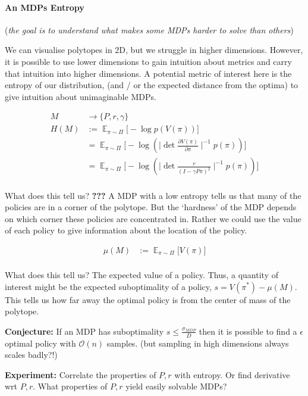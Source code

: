 \paragraph{An MDPs Entropy}

(\emph{the goal is to understand what makes some MDPs harder to solve
than others})

We can visualise polytopes in 2D, but we struggle in higher dimensions.
However, it is possible to use lower dimensions to gain intuition about
metrics and carry that intuition into higher dimensions. A potential
metric of interest here is the entropy of our distribution, (and / or
the expected distance from the optima) to give intuition about
unimaginable MDPs.

\begin{align}
M &\to \{P, r, \gamma\} \tag{a MDP}\\
H(M) &:= \mathop{\mathbb E}_{\pi\sim\Pi}\Big[-\log p(V(\pi)) \Big]\\
&= \mathop{\mathbb E}_{\pi\sim\Pi}\Big[-\log(\mid \det\frac{\partial V(\pi)}{\partial \pi}\mid^{-1}p(\pi)) \Big] \\
&= \mathop{\mathbb E}_{\pi\sim\Pi}\Big[-\log(\mid \det \frac{r}{(I-\gamma P \pi)^2}\mid^{-1}p(\pi)) \Big] \\
\end{align}

What does this tell us? \textbf{???} A MDP with a low entropy tells us
that many of the policies are in a corner of the polytope. But the
`hardness' of the MDP depends on which corner these policies are
concentrated in. Rather we could use the value of each policy to give
information about the location of the policy.

\begin{align*}
\mu(M) &:= \mathop{\mathbb E}_{\pi\sim\Pi}\Big[V(\pi) \Big]\\
\end{align*}

What does this tell us? The expected value of a policy. Thus, a quantity
of interest might be the expected suboptimality of a policy,
\(s = V(\pi^{* })-\mu(M)\). This tells us how far away the optimal
policy is from the center of mass of the polytope.

\textbf{Conjecture:} If an MDP has suboptimality
\(s \le \frac{\sigma_{MDP}}{D}\) then it is possible to find a
\(\epsilon\) optimal policy with \(\mathcal O(n)\) samples. (but
sampling in high dimensions always scales badly?!)

\textbf{Experiment:} Correlate the properties of \(P, r\) with entropy.
Or find derivative wrt \(P, r\). What properties of \(P, r\) yield
easily solvable MDPs?

